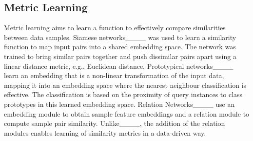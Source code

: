 \subsection{Metric Learning}
Metric learning aims to learn a function to effectively compare similarities between data samples. Siamese networks____ was used to learn a similarity function to map input pairs into a shared embedding space. The network was trained to bring similar pairs together and push dissimilar pairs apart using a linear distance metric, e.g., Euclidean distance. Prototypical networks____ learn an embedding that is a non-linear transformation of the input data, mapping it into an embedding space where the nearest neighbour classification is effective. The classification is based on the proximity of query instances to class prototypes in this learned embedding space. Relation Networks____ use an embedding module to obtain sample feature embeddings and a relation module to compute sample pair similarity. Unlike____, the addition of the relation modules enables learning of similarity metrics in a data-driven way. 


